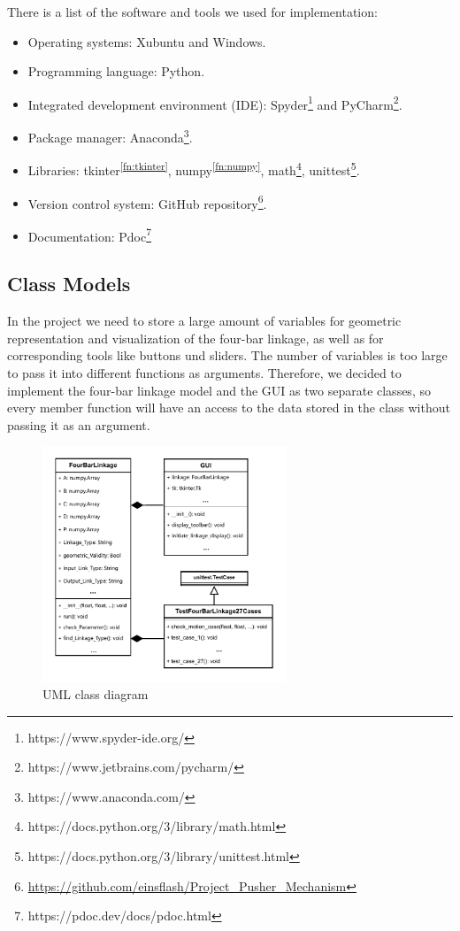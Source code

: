 \documentclass{article}
\begin{document}
There is a list of the software and tools we used for implementation:
\begin{itemize}
	\item Operating systems: Xubuntu and Windows.
	\item Programming language: Python.
	\item Integrated development environment (IDE): Spyder\footnote{https://www.spyder-ide.org/} and PyCharm\footnote{https://www.jetbrains.com/pycharm/}.
	\item Package manager: Anaconda\footnote{https://www.anaconda.com/}.
	\item Libraries: tkinter\textsuperscript{\ref{fn:tkinter}}, numpy\textsuperscript{\ref{fn:numpy}}, math\footnote{https://docs.python.org/3/library/math.html}, unittest\footnote{https://docs.python.org/3/library/unittest.html}.
	\item Version control system: GitHub repository\footnote{\url{https://github.com/einsflash/Project_Pusher_Mechanism}}.
	\item Documentation: Pdoc\footnote{https://pdoc.dev/docs/pdoc.html}
\end{itemize}

\subsection{Class Models}

In the project we need to store a large amount of variables for geometric representation and visualization of the four-bar linkage, as well as for corresponding tools like buttons und sliders. The number of variables is too large to pass it into different functions as arguments. Therefore, we decided to implement the four-bar linkage model and the GUI as two separate classes, so every member function will have an access to the data stored in the class without passing it as an argument.

\begin{figure}[h]
	\begin{center}
		\includegraphics[width=0.65\textwidth]{./figures/class_diagram.pdf}
	\end{center}
	\caption{UML class diagram}
	\label{fig:class diagram}
\end{figure}
\end{document}
